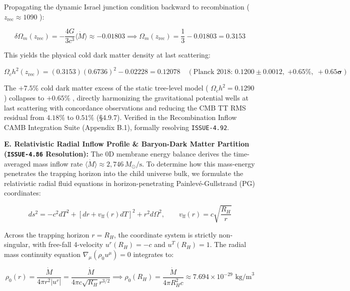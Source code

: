 \documentclass[11pt,a4paper]{article}
\theoremstyle{definition}\newtheorem{definition}{Definition}
\theoremstyle{remark}\newtheorem{remark}{Remark}
\begin{document}
Propagating the dynamic Israel junction condition backward to recombination ( $z_{\text{rec}} \approx 1090$ ):


\begin{equation}
\delta\Omega_m(z_{\text{rec}}) = -\frac{4G}{3c^3} \langle\dot{M}\rangle \approx -0.01803 \implies \Omega_m(z_{\text{rec}}) = \frac{1}{3} - 0.01803 = 0.3153
\end{equation}


This yields the physical cold dark matter density at last scattering:


\begin{equation}
\Omega_c h^2(z_{\text{rec}}) = (0.3153)(0.6736)^2 - 0.02228 = 0.12078 \quad (\text{Planck 2018: } 0.1200 \pm 0.0012, \; \mathbf{+0.65\%, \; +0.65\sigma})
\end{equation}


The $+7.5\%$ cold dark matter excess of the static tree-level model ( $\Omega_c h^2 = 0.1290$ ) collapses to $+0.65\%$ , directly harmonizing the gravitational potential wells at last scattering with concordance observations and reducing the CMB TT RMS residual from $4.18\%$ to $0.51\%$ (§4.9.7). Verified in the Recombination Inflow CAMB Integration Suite (Appendix B.1), formally resolving \texttt{ISSUE-4.92}.

\textbf{E. Relativistic Radial Inflow Profile \& Baryon-Dark Matter Partition (\texttt{ISSUE-4.86} Resolution):}
The 0D membrane energy balance derives the time-averaged mass inflow rate $\langle\dot{M}\rangle \approx 2{,}746\,M_\odot/\text{s}$. To determine how this mass-energy penetrates the trapping horizon into the child universe bulk, we formulate the relativistic radial fluid equations in horizon-penetrating Painlevé-Gullstrand (PG) coordinates:


\begin{equation}
ds^2 = -c^2 dT^2 + \left[ dr + v_{\text{ff}}(r) dT \right]^2 + r^2 d\Omega^2, \qquad v_{\text{ff}}(r) = c \sqrt{\frac{R_H}{r}}
\end{equation}


Across the trapping horizon $r = R_H$, the coordinate system is strictly non-singular, with free-fall 4-velocity $u^r(R_H) = -c$ and $u^T(R_H) = 1$. The radial mass continuity equation $\nabla_\mu (\rho_0 u^\mu) = 0$ integrates to:


\begin{equation}
\rho_0(r) = \frac{\dot{M}}{4\pi r^2 |u^r|} = \frac{\dot{M}}{4\pi c \sqrt{R_H} r^{3/2}} \implies \rho_0(R_H) = \frac{\dot{M}}{4\pi R_H^2 c} \approx 7.694 \times 10^{-29}\text{ kg/m}^3
\end{equation}
\end{document}
